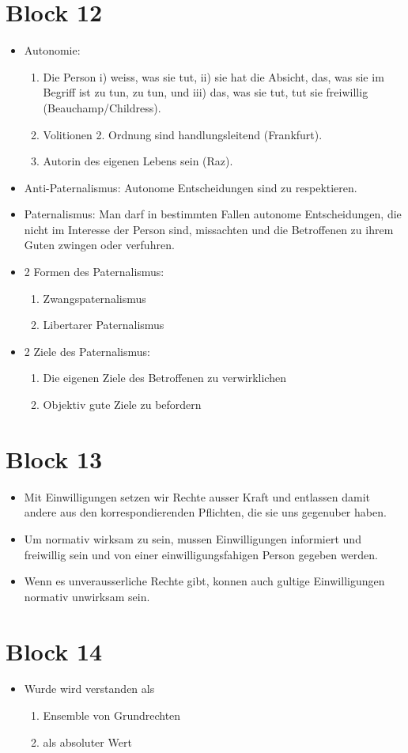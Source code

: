 \documentclass[../main.tex]{subfiles}
\begin{document}
\section{Block 12}
\begin{itemize}
	\item Autonomie: \begin{enumerate}[label=(\alph*)]
			\item Die Person i) weiss, was sie tut, ii) sie hat die Absicht, das, was sie im Begriff ist zu tun, zu tun, und iii) das, was sie tut, tut sie freiwillig (Beauchamp/Childress).
			\item Volitionen 2. Ordnung sind handlungsleitend (Frankfurt).
			\item Autorin des eigenen Lebens sein (Raz).     
		\end{enumerate}
	\item Anti-Paternalismus: Autonome Entscheidungen sind zu respektieren.
	\item Paternalismus: Man darf in bestimmten Fallen autonome Entscheidungen, die nicht im Interesse der Person sind, missachten und die Betroffenen zu ihrem Guten zwingen oder verfuhren.
	\item 2 Formen des Paternalismus:\begin{enumerate}
			\item Zwangspaternalismus
			\item Libertarer Paternalismus
		\end{enumerate}
	\item 2 Ziele des Paternalismus:\begin{enumerate}
			\item Die eigenen Ziele des Betroffenen zu verwirklichen
			\item Objektiv gute Ziele zu befordern
		\end{enumerate}
\end{itemize}


\section{Block 13}
\begin{itemize}
	\item Mit Einwilligungen setzen wir Rechte ausser Kraft und entlassen damit andere aus den korrespondierenden Pflichten, die sie uns gegenuber haben.
	\item Um normativ wirksam zu sein, mussen Einwilligungen informiert und freiwillig sein und von einer einwilligungsfahigen Person gegeben werden. 
	\item Wenn es unverausserliche Rechte gibt, konnen auch gultige Einwilligungen normativ unwirksam sein. 
\end{itemize}


\section{Block 14}
\begin{itemize}
	\item Wurde wird verstanden als \begin{enumerate}[label=(\alph*)]
			\item Ensemble von Grundrechten 
			\item als absoluter Wert
		\end{enumerate}
\end{itemize}
 
\end{document}
